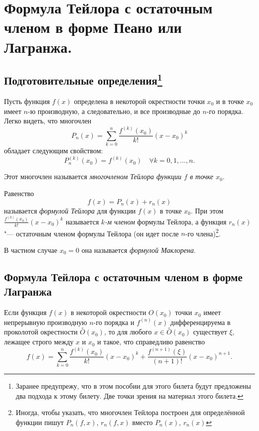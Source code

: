 \chapter{Формула Тейлора с остаточным членом в форме Пеано или Лагранжа.}

\section[Подготовительные определения]{Подготовительные определения\footnote{Заранее предупрежу, что в этом пособии для этого билета будут предложены два подхода к этому билету. Две точки зрения на материал этого билета.}}

Пусть функция $f(x)$ определена в некоторой окрестности точки $x_0$ и в точке $x_0$ имеет $n$-ю производную, а следовательно, и все производные до $n$-го порядка. Легко видеть, что многочлен
$$
P_n(x) = \sum_{k = 0}^{n} \frac{f^{(k)}(x_0)}{k!} (x - x_0)^k
$$
обладает следующим свойством:
$$
P_n^{(k)}(x_0) = f^{(k)}(x_0) \quad \forall k = 0,1,\ldots,n.
$$

\noindent Этот многочлен называется \textit{многочленом Тейлора функции $f$ в точке $x_0$}.

Равенство $$f(x) = P_n(x) + r_n(x)$$ называется \textit{формулой Тейлора} для функции $f(x)$ в точке $x_0$. При этом $\frac{f^{(k)}(x_0)}{k!} (x - x_0)^k$ называется \textit{$k$-м членом} формулы Тейлора, а функция $r_n(x)$ "--- остаточным членом формулы Тейлора (он идет после $n$-го члена)\footnote{Иногда, чтобы указать, что многочлен Тейлора построен для определённой функции пишут $P_n(f,x)$, $r_n(f,x)$ вместо $P_n(x)$, $r_n(x)$}. 

\begin{notion} В частном случае $x_0=0$ она называется \textit{формулой Маклорена}.
\end{notion}

\section[Формула Тейлора с остаточным членом в форме Лагранжа]{Формула Тейлора с остаточным членом в форме Лагранжа}
	
\begin{thm} \label{ch5.thm1}
Если функция $f(x)$ в некоторой окрестности $O(x_0)$ точки $x_0$ имеет непрерывную производную $n$-го порядка и $f^{(n)}(x)$ дифференцируема в проколотой окрестности $\overset{\circ}{O}(x_0)$, то для любого
$x \in \overset{\circ}{O}(x_0)$ существует $\xi$, лежащее строго между $x$ и $x_0$ и такое, что справедливо равенство
\begin{equation} \label{ch5.1eq1}
f(x) = \sum_{k = 0}^{n} \frac{f^{(k)}(x_0)}{k!}(x - x_0)^k + \frac{f^{(n + 1)}(\xi)}{(n + 1)!}(x - x_0)^{n + 1}.
\end{equation}
\end{thm}


